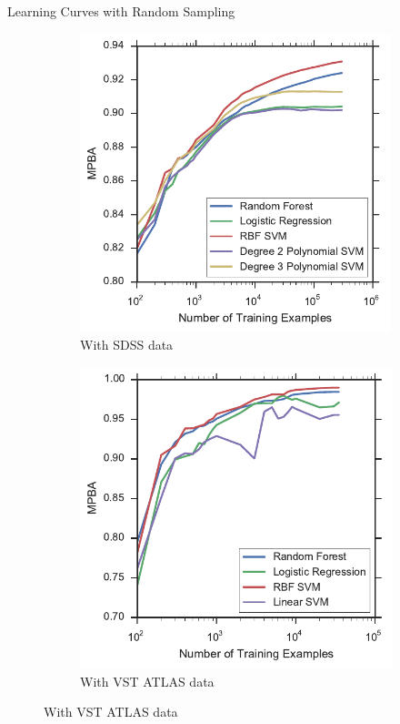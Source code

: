 \documentclass{beamer}
\begin{document}
\begin{frame}{Learning Curves with Random Sampling}
\begin{figure}[tbp]
	\centering
	\begin{subfigure}{.5\textwidth}
		\centering
		\includegraphics[width=0.99\textwidth]{../thesis/figures/4_expt1/sdss_learning_curves}
		\caption{With SDSS data}
		\label{fig:sdss_learning_curves}
	\end{subfigure}%
	\begin{subfigure}{.5\textwidth}
		\centering
		\includegraphics[width=0.99\linewidth]{../thesis/figures/4_expt1/vstatlas_learning_curves}
		\caption{With VST ATLAS data}
		\label{fig:vstatlas_learning_curves}
	\end{subfigure}
	\label{fig:learning_curves}
\end{figure}
\end{frame}
\end{document}
